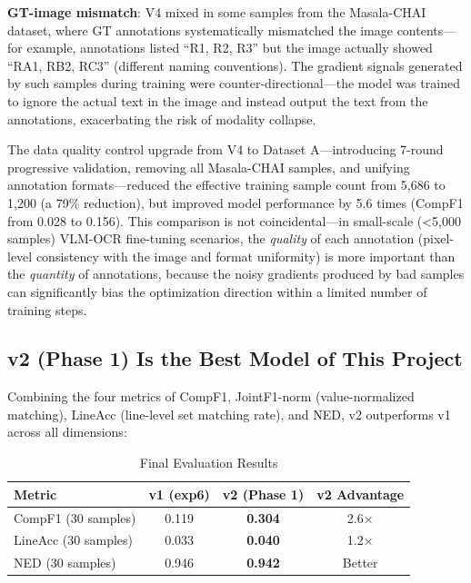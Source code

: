 \textbf{GT-image mismatch}: V4 mixed in some samples from the Masala-CHAI dataset, where GT annotations systematically mismatched the image contents---for example, annotations listed ``R1, R2, R3'' but the image actually showed ``RA1, RB2, RC3'' (different naming conventions). The gradient signals generated by such samples during training were counter-directional---the model was trained to ignore the actual text in the image and instead output the text from the annotations, exacerbating the risk of modality collapse.

The data quality control upgrade from V4 to Dataset A---introducing 7-round progressive validation, removing all Masala-CHAI samples, and unifying annotation formats---reduced the effective training sample count from 5,686 to 1,200 (a 79\% reduction), but improved model performance by 5.6 times (CompF1 from 0.028 to 0.156). This comparison is not coincidental---in small-scale (<5,000 samples) VLM-OCR fine-tuning scenarios, the \textit{quality} of each annotation (pixel-level consistency with the image and format uniformity) is more important than the \textit{quantity} of annotations, because the noisy gradients produced by bad samples can significantly bias the optimization direction within a limited number of training steps.

\subsection{v2 (Phase 1) Is the Best Model of This Project}

Combining the four metrics of CompF1, JointF1-norm (value-normalized matching), LineAcc (line-level set matching rate), and NED, v2 outperforms v1 across all dimensions:

\begin{table}[h]
\centering
\caption{Final Evaluation Results}
\begin{tabular}{lccc}
\toprule
\textbf{Metric} & \textbf{v1 (exp6)} & \textbf{v2 (Phase 1)} & \textbf{v2 Advantage} \\
\midrule
CompF1 (30 samples)    & 0.119 & \textbf{0.304} & 2.6$\times$ \\
LineAcc (30 samples)   & 0.033 & \textbf{0.040} & 1.2$\times$ \\
NED (30 samples)       & 0.946 & \textbf{0.942} & Better \\
\bottomrule
\end{tabular}
\end{table}

